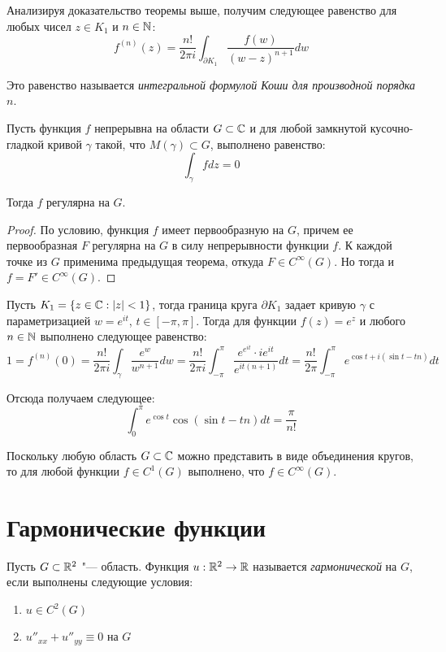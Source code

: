 \begin{note}
	Анализируя доказательство теоремы выше, получим следующее равенство для любых чисел $z \in K_1$ и $n \in \mathbb{N}$:
	\[f^{(n)}(z) = \frac{n!}{2\pi i}\int_{\partial K_1}\frac{f(w)}{(w - z)^{n+1}}dw\]
	
	Это равенство называется \textit{интегральной формулой Коши для производной порядка $n$}.
\end{note}

\begin{theorem}[Мореры]
	Пусть функция $f$ непрерывна на области $G \subset \mathbb{C}$ и для любой замкнутой кусочно-гладкой кривой $\gamma$ такой, что $M(\gamma) \subset G$, выполнено равенство:
	\[\int_\gamma fdz = 0\]
	
	Тогда $f$ регулярна на $G$.
\end{theorem}

\begin{proof}
	По условию, функция $f$ имеет первообразную на $G$, причем ее первообразная $F$ регулярна на $G$ в силу непрерывности функции $f$. К каждой точке из $G$ применима предыдущая теорема, откуда $F \in C^\infty(G)$. Но тогда и $f = F' \in C^\infty(G)$.
\end{proof}

\begin{example}
	Пусть $K_1 = \{z \in \mathbb{C}: |z| < 1\}$, тогда граница круга $\partial K_1$ задает кривую $\gamma$ с параметризацией $w = e^{it}$, $t \in [-\pi, \pi]$. Тогда для функции $f(z) = e^z$ и любого $n \in \mathbb{N}$ выполнено следующее равенство:
	\[1 = f^{(n)}(0) = \frac{n!}{2\pi i} \int_\gamma \frac{e^w}{w^{n+1}}dw = \frac{n!}{2\pi i} \int_{-\pi}^\pi \frac{e^{e^{it}}\cdot ie^{it}}{e^{it(n+1)}}dt = \frac{n!}{2\pi} \int_{-\pi}^\pi e^{\cos{t} + i(\sin{t} - tn)}dt\]
	
	Отсюда получаем следующее:
	\[\int_{0}^\pi e^{\cos{t}}\cos{(\sin{t} - tn)}dt = \frac\pi{n!}\]
\end{example}

\begin{note}
	Поскольку любую область $G \subset \mathbb{C}$ можно представить в виде объединения кругов, то для любой функции $f \in C^1(G)$ выполнено, что $f \in C^\infty(G)$.
\end{note}

\section{Гармонические функции}

\begin{definition}
	Пусть $G \subset \mathbb{R}^2$ "--- область. Функция $u : \mathbb{R}^2 \to \mathbb{R}$ называется \textit{гармонической} на $G$, если выполнены следующие условия:
	\begin{enumerate}
		\item $u \in C^2(G)$
		\item $u''_{xx} + u''_{yy} \equiv 0$ на $G$
	\end{enumerate}
\end{definition}

